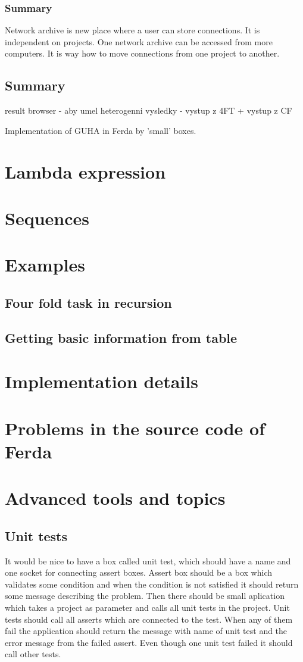\documentclass{article}
\begin{document}
\subsubsection{Summary}
Network archive is new place where a user can store connections. It is independent on projects. One network archive can be accessed from more computers. It is way how to move connections from one project to another.


\subsection{Summary}

result browser - aby umel heterogenni vysledky - vystup z 4FT + vystup z CF

Implementation of GUHA in Ferda by 'small' boxes.
\section{Lambda expression}
\section{Sequences}
\section{Examples}
\subsection{Four fold task in recursion}
\subsection{Getting basic information from table}
\section{Implementation details}
\section{Problems in the source code of Ferda}
\section{Advanced tools and topics}
\subsection{Unit tests}
It would be nice to have a box called unit test, which should have a name and one socket for connecting assert boxes. Assert box should be a box which validates some condition and when the condition is not satisfied it should return some message describing the problem. Then there should be small aplication which takes a project as parameter and calls all unit tests in the project. Unit tests should call all asserts which are connected to the test. When any of them fail the application should return the message with name of unit test and the error message from the failed assert. Even though one unit test failed it should call other tests.
\end{document}
